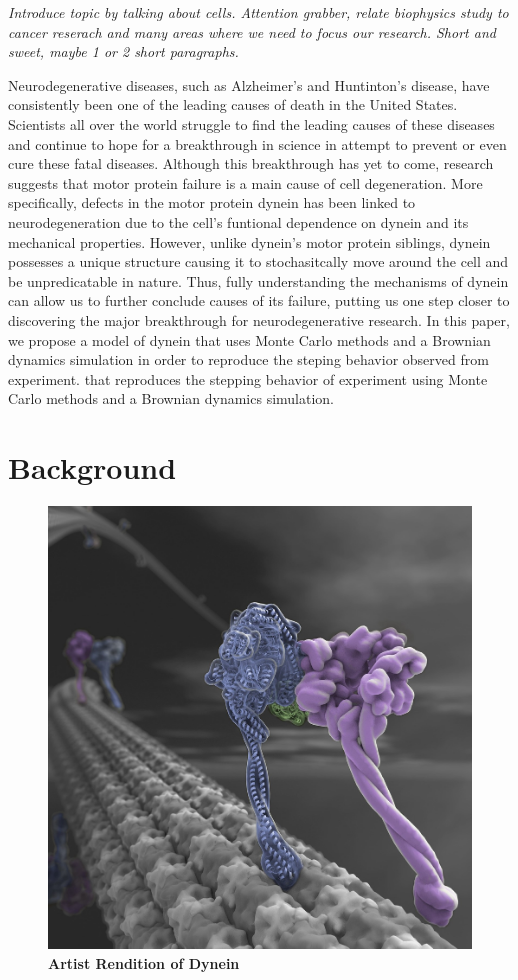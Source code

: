 \textit{Introduce topic by talking about cells. Attention grabber, relate biophysics study to cancer reserach and many areas where we need to focus our research. Short and sweet, maybe 1 or 2 short paragraphs.}

	Neurodegenerative diseases, such as Alzheimer's and Huntinton's disease, have consistently been one of the leading causes of death in the United States. Scientists all over the world struggle to find the leading causes of these diseases and continue to hope for a breakthrough in science in attempt to prevent or even cure these fatal diseases. Although this breakthrough has yet to come, research suggests that motor protein failure is a main cause of cell degeneration. More specifically, defects in the motor protein dynein has been linked to neurodegeneration due to the cell's funtional dependence on dynein and its mechanical properties. However, unlike dynein's motor protein siblings, dynein possesses a unique structure causing it to stochasitcally move around the cell and be unpredicatable in nature. Thus, fully understanding the mechanisms of dynein can allow us to further conclude causes of its failure, putting us one step closer to discovering the major breakthrough for neurodegenerative research. In this paper, we propose a model of dynein that uses Monte Carlo methods and a Brownian dynamics simulation in order to reproduce the steping behavior observed from experiment. that reproduces the stepping behavior of experiment using Monte Carlo methods and a Brownian dynamics simulation.  

\section{Background}

\begin{figure}[H]
	\centering
	\includegraphics[width=0.5\columnwidth]{Figures/dynein_walking_art.jpg}
	\caption[Artist Rendition of Dynein]{\textbf{Artist Rendition of Dynein} \cite{JohnsonArt}}
	\label{fig:ArtDynein}
\end{figure}

